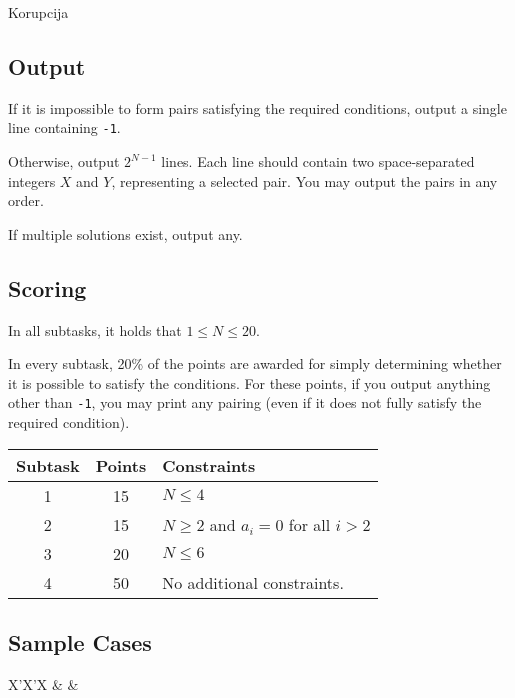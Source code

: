 \begin{statement}[
  problempoints=100,
  timelimit=1 second,
  memorylimit=512 MiB,
]{Korupcija}
\subsection*{Output}

If it is impossible to form pairs satisfying the required conditions, 
output a single line containing \texttt{-1}.

Otherwise, output $2^{N-1}$ lines. Each line should contain two space-separated integers $X$ and $Y$, 
representing a selected pair.  
You may output the pairs in any order.

If multiple solutions exist, output any.

\subsection*{Scoring}

In all subtasks, it holds that $1 \leq N \leq 20$.

In every subtask, 20\% of the points are awarded for simply determining 
whether it is possible to satisfy the conditions.  
For these points, if you output anything other than \texttt{-1}, 
you may print any pairing (even if it does not fully satisfy the required condition).

{\renewcommand{\arraystretch}{1.4}
  \setlength{\tabcolsep}{6pt}
  \begin{tabular}{ccl}
   Subtask & Points & Constraints \\ \midrule
    1 & 15 & $N \leq 4$ \\
    2 & 15 & $N \geq 2$ and $a_i = 0$ for all $i > 2$ \\
    3 & 20 & $N \leq 6$ \\
    4 & 50 & No additional constraints. \\
\end{tabular}}

\subsection*{Sample Cases}
\begin{tabularx}{\textwidth}{X'X'X}
 &
 &
\end{tabularx}

\end{statement}
